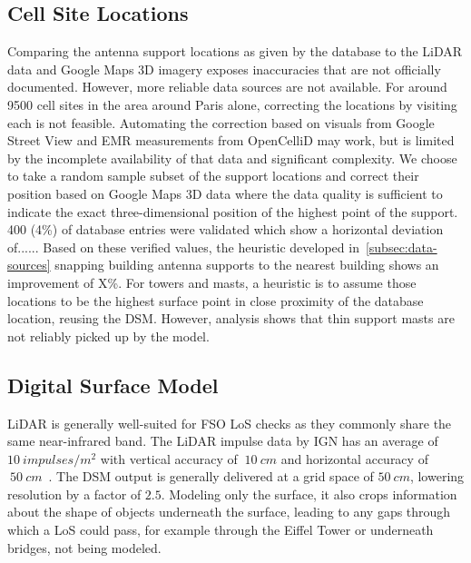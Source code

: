 \documentclass[conference]{IEEEtran}
\begin{document}
    \subsection{Cell Site Locations}\label{subsec:cell-site-locations}
    Comparing the antenna support locations as given by the database to the LiDAR data and Google Maps 3D imagery exposes inaccuracies that are not officially documented.
    However, more reliable data sources are not available.
    For around 9500 cell sites in the area around Paris alone, correcting the locations by visiting each is not feasible.
    Automating the correction based on visuals from Google Street View and EMR measurements from OpenCelliD may work, but is limited by the incomplete availability of that data and significant complexity.
    We choose to take a random sample subset of the support locations and correct their position based on Google Maps 3D data where the data quality is sufficient to indicate the exact three-dimensional position of the highest point of the support.
    400 (4\%) of database entries were validated which show a horizontal deviation of...... 
    Based on these verified values, the heuristic developed in~\cref{subsec:data-sources} snapping building antenna supports to the nearest building shows an improvement of X\%.
    For towers and masts, a heuristic is to assume those locations to be the highest surface point in close proximity of the database location, reusing the DSM.
    However, analysis shows that thin support masts are not reliably picked up by the model.


    \subsection{Digital Surface Model}\label{subsec:digital-surface-model}
    LiDAR is generally well-suited for FSO LoS checks as they commonly share the same near-infrared band.
    The LiDAR impulse data by IGN has an average of $10\ impulses/m^2$ with vertical accuracy of $~10\ cm$ and horizontal accuracy of $~50\ cm$~\cite{lidar}.
    The DSM output is generally delivered at a grid space of $50\ cm$, lowering resolution by a factor of $2.5$.
    Modeling only the surface, it also crops information about the shape of objects underneath the surface, leading to any gaps through which a LoS could pass, for example through the Eiffel Tower or underneath bridges, not being modeled.
\end{document}
